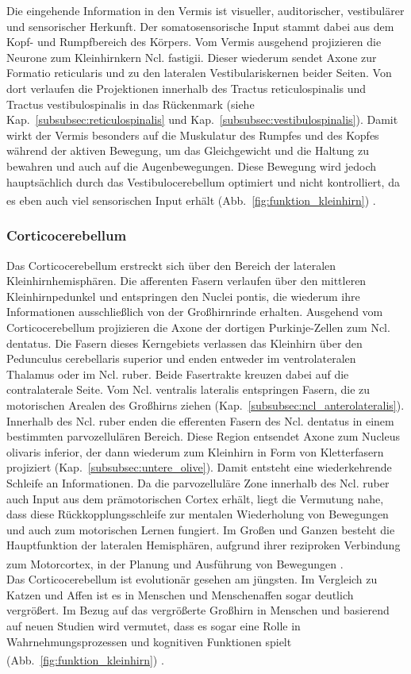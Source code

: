 Die eingehende Information in den Vermis ist visueller, auditorischer, vestibulärer und sensorischer Herkunft. Der somatosensorische Input stammt dabei aus dem Kopf- und Rumpfbereich des Körpers. Vom Vermis ausgehend projizieren die Neurone zum Kleinhirnkern Ncl. fastigii. Dieser wiederum sendet Axone zur Formatio reticularis und zu den lateralen Vestibulariskernen beider Seiten. Von dort verlaufen die Projektionen innerhalb des Tractus reticulospinalis und Tractus vestibulospinalis in das Rückenmark (siehe Kap.~\ref{subsubsec:reticulospinalis} und Kap.~\ref{subsubsec:vestibulospinalis}). Damit wirkt der Vermis besonders auf die Muskulatur des Rumpfes und des Kopfes während der aktiven Bewegung, um das Gleichgewicht und die Haltung zu bewahren und auch auf die Augenbewegungen. Diese Bewegung wird jedoch hauptsächlich durch das Vestibulocerebellum optimiert und nicht kontrolliert, da es eben auch viel sensorischen Input erhält (Abb.~\ref{fig:funktion_kleinhirn}) \textsuperscript{\cite[Kap.~42]{kandel2013principles}}.   

\subsubsection*{Corticocerebellum} 
Das Corticocerebellum erstreckt sich über den Bereich der lateralen Kleinhirnhemisphären. Die afferenten Fasern verlaufen über den mittleren Kleinhirnpedunkel und entspringen den Nuclei pontis, die wiederum ihre Informationen ausschließlich von der Großhirnrinde erhalten. Ausgehend vom Corticocerebellum projizieren die Axone der dortigen Purkinje-Zellen zum Ncl. dentatus. Die Fasern dieses Kerngebiets verlassen das Kleinhirn über den Pedunculus cerebellaris superior und enden entweder im ventrolateralen Thalamus oder im Ncl. ruber. Beide Fasertrakte kreuzen dabei auf die contralaterale Seite. Vom Ncl. ventralis lateralis entspringen Fasern, die zu motorischen Arealen des Großhirns ziehen (Kap.~\ref{subsubsec:ncl_anterolateralis}). Innerhalb des Ncl. ruber enden die efferenten Fasern des Ncl. dentatus in einem bestimmten parvozellulären Bereich. Diese Region entsendet Axone zum Nucleus olivaris inferior, der dann wiederum zum Kleinhirn in Form von Kletterfasern projiziert (Kap.~\ref{subsubsec:untere_olive}). Damit entsteht eine wiederkehrende Schleife an Informationen. Da die parvozelluläre Zone innerhalb des Ncl. ruber auch Input aus dem prämotorischen Cortex erhält, liegt die Vermutung nahe, dass diese Rückkopplungsschleife zur mentalen Wiederholung von Bewegungen und auch zum motorischen Lernen fungiert. Im Großen und Ganzen besteht die Hauptfunktion der lateralen Hemisphären, aufgrund ihrer reziproken Verbindung zum Motorcortex, in der Planung und Ausführung von Bewegungen \textsuperscript{\cite[Kap.~42]{kandel2013principles}}.\\
Das Corticocerebellum ist evolutionär gesehen am jüngsten. Im Vergleich zu Katzen und Affen ist es in Menschen und Menschenaffen sogar deutlich vergrößert. Im Bezug auf das vergrößerte Großhirn in Menschen und basierend auf neuen Studien wird vermutet, dass es sogar eine Rolle in Wahrnehmungsprozessen und kognitiven Funktionen spielt (Abb.~\ref{fig:funktion_kleinhirn}) \textsuperscript{\cite[Kap.~42]{kandel2013principles}}. 

